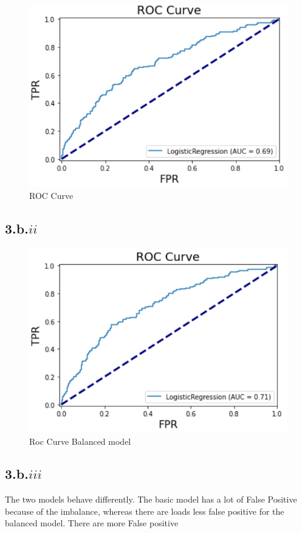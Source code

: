 \documentclass{article}
\begin{document}
    \begin{figure}[H]
        \center
        \includegraphics{ROC_curve.png}
        \caption{ROC Curve}
        \label{ROC Curve}
    \end{figure} 
    \newpage
    \subsection*{3.b.$ii$}
    \begin{figure}[H]
        \center
        \includegraphics{ROC_curve_bal.png}
        \caption{Roc Curve Balanced model}
    \end{figure}
    \subsection*{3.b.$iii$}
    The two models behave differently. The basic model has a lot of False Positive because of the imbalance, whereas there
     are loads less false positive for the balanced model. There are more False positive
\end{document}
